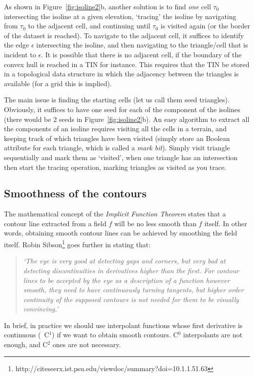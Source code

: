 %

As shown in Figure~\ref{fig:isoline2}b, another solution is to find \emph{one} cell $\tau_0$ intersecting the isoline at a given elevation, `tracing' the isoline by navigating from $\tau_0$ to the adjacent cell, and continuing until $\tau_0$ is visited again (or the border of the dataset is reached).
To navigate to the adjacent cell, it suffices to identify the edge $\epsilon$ intersecting the isoline, and then navigating to the triangle/cell that is incident to $\epsilon$.
It is possible that there is no adjacent cell, if the boundary of the convex hull is reached in a TIN for instance.
This requires that the TIN be stored in a topological data structure in which the adjacency between the triangles is available (for a grid this is implied).

The main issue is finding the starting cells (let us call them seed triangles).
Obviously, it suffices to have one seed for each of the component of the isolines (there would be 2 seeds in Figure~\ref{fig:isoline2}b).
An easy algorithm to extract all the components of an isoline requires visiting all the cells in a terrain, and keeping track of which triangles have been visited (simply store an Boolean attribute for each triangle, which is called a \emph{mark bit}).
Simply visit triangle sequentially and mark them as `visited', when one triangle has an intersection then start the tracing operation, marking triangles as visited as you trace. 


\subsection{Smoothness of the contours}
The mathematical concept of the \emph{Implicit Function Theorem} states that a contour line extracted from a field $f$ will be no less smooth than $f$ itself.
In other words, obtaining smooth contour lines can be achieved by smoothing the field itself.
Robin Sibson\footnote{http://citeseerx.ist.psu.edu/viewdoc/summary?doi=10.1.1.51.63} goes further in stating that:
\begin{quote}
  \emph{`The eye is very good at detecting gaps and corners, but very bad at detecting discontinuities in derivatives higher than the first. 
  For contour lines to be accepted by the eye as a description of a function however smooth, they need to have continuously turning tangents, but higher order continuity of the supposed contours is not needed for them to be visually convincing.'}
\end{quote}
In brief, in practice we should use interpolant functions whose first derivative is continuous (\ie\ C$^1$) if we want to obtain smooth contours. 
C$^0$ interpolants are not enough, and C$^2$ ones are not necessary.



